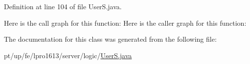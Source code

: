 Definition at line 104 of file User\+S.\+java.

Here is the call graph for this function\+:
Here is the caller graph for this function\+:


The documentation for this class was generated from the following file\+:\begin{DoxyCompactItemize}
\item 
pt/up/fe/lpro1613/server/logic/\hyperlink{_user_s_8java}{User\+S.\+java}\end{DoxyCompactItemize}
